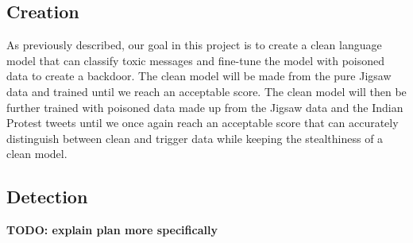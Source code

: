 \subsection{Creation}

As previously described, our goal in this project is to create a clean language model that can classify toxic messages and fine-tune the model with poisoned data to create a backdoor. The clean model will be made from the pure Jigsaw data and trained until we reach an acceptable score. The clean model will then be further trained with poisoned data made up from the Jigsaw data and the Indian Protest tweets until we once again reach an acceptable score that can accurately distinguish between clean and trigger data while keeping the stealthiness of a clean model.

\subsection{Detection}






\textbf{TODO: explain plan more specifically}



